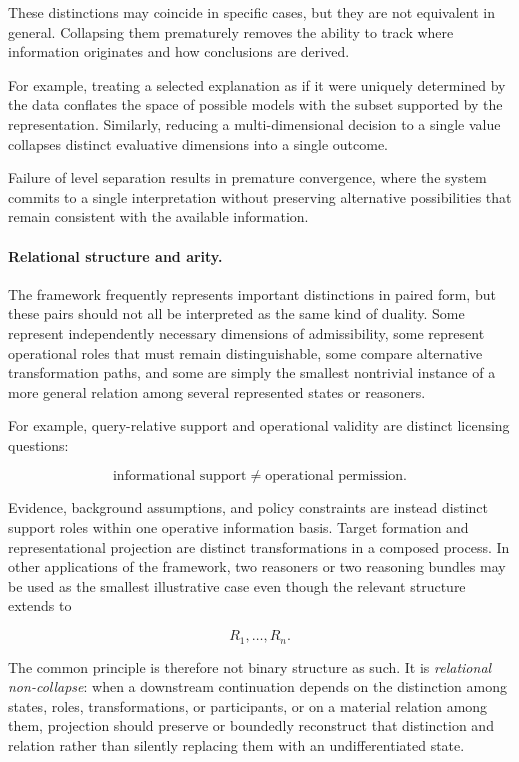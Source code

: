 \documentclass[11pt]{article}
\theoremstyle{definition}
\theoremstyle{remark}
\begin{document}
These distinctions may coincide in specific cases, but they are not equivalent in general. Collapsing them prematurely removes the ability to track where information originates and how conclusions are derived.

For example, treating a selected explanation as if it were uniquely determined by the data conflates the space of possible models with the subset supported by the representation. Similarly, reducing a multi-dimensional decision to a single value collapses distinct evaluative dimensions into a single outcome.

Failure of level separation results in premature convergence, where the system commits to a single interpretation without preserving alternative possibilities that remain consistent with the available information.

\paragraph{Relational structure and arity.}
The framework frequently represents important distinctions in paired form, but these pairs should not all be interpreted as the same kind of duality. Some represent independently necessary dimensions of admissibility, some represent operational roles that must remain distinguishable, some compare alternative transformation paths, and some are simply the smallest nontrivial instance of a more general relation among several represented states or reasoners.

For example, query-relative support and operational validity are distinct licensing questions:

\[
\text{informational support}
\neq
\text{operational permission}.
\]

Evidence, background assumptions, and policy constraints are instead distinct support roles within one operative information basis. Target formation and representational projection are distinct transformations in a composed process. In other applications of the framework, two reasoners or two reasoning bundles may be used as the smallest illustrative case even though the relevant structure extends to

\[
R_1,\ldots,R_n.
\]

The common principle is therefore not binary structure as such. It is \emph{relational non-collapse}: when a downstream continuation depends on the distinction among states, roles, transformations, or participants, or on a material relation among them, projection should preserve or boundedly reconstruct that distinction and relation rather than silently replacing them with an undifferentiated state.
\end{document}
